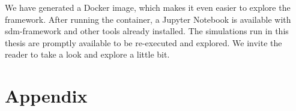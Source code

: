 We have generated a Docker image, which makes it even easier to explore the framework. After running the container, a Jupyter Notebook is available with sdm-framework and other tools already installed. The simulations run in this thesis are promptly available to be re-executed and explored. We invite the reader to take a look and explore a little bit.


\chapter{Appendix}

%
